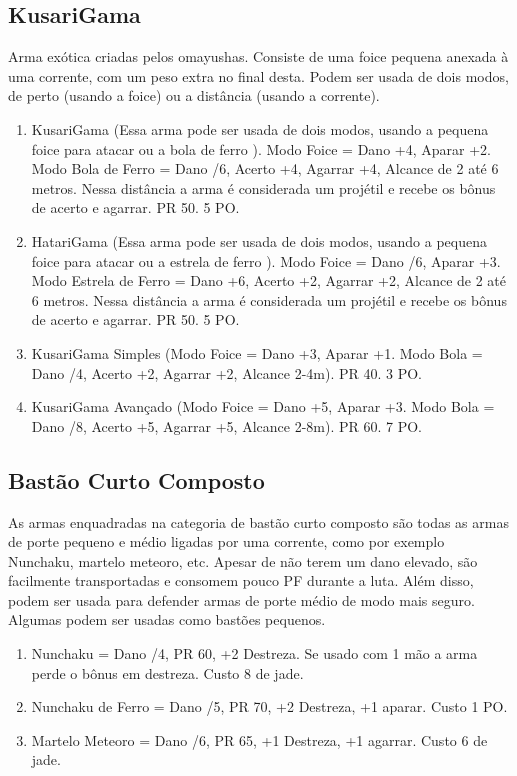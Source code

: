 \subsection{KusariGama}
Arma exótica criadas pelos omayushas. Consiste de uma foice pequena anexada à uma corrente, com um peso extra no final desta. Podem ser usada de dois modos, de perto (usando a foice) ou a distância (usando a corrente).

\begin{enumerate}
	\item KusariGama (Essa arma pode ser usada de dois modos, usando a pequena foice para atacar ou a bola de ferro ). Modo Foice = Dano +4, Aparar +2. Modo Bola de Ferro = Dano /6, Acerto +4, Agarrar +4, Alcance de 2 até 6 metros. Nessa distância a arma é considerada um projétil e recebe os bônus de acerto e agarrar. PR 50. 5 PO. 
	\item HatariGama (Essa arma pode ser usada de dois modos, usando a pequena foice para atacar ou a estrela de ferro ). Modo Foice = Dano /6, Aparar +3. Modo Estrela de Ferro = Dano +6, Acerto +2, Agarrar +2, Alcance de 2 até 6 metros. Nessa distância a arma é considerada um projétil e recebe os bônus de acerto e agarrar. PR 50. 5 PO. 
	\item KusariGama Simples (Modo Foice = Dano +3, Aparar +1. Modo Bola = Dano /4, Acerto +2, Agarrar +2, Alcance 2-4m). PR 40. 3 PO.
	\item KusariGama Avançado (Modo Foice = Dano +5, Aparar +3. Modo Bola = Dano /8, Acerto +5, Agarrar +5, Alcance 2-8m). PR 60. 7 PO.
\end{enumerate}


\subsection{Bastão Curto Composto}
As armas enquadradas na categoria de bastão curto composto são todas as armas de porte pequeno e médio ligadas por uma corrente, como por exemplo Nunchaku, martelo meteoro, etc. Apesar de não terem um dano elevado, são facilmente transportadas e consomem pouco PF durante a luta. Além disso, podem ser usada para defender armas de porte médio de modo mais seguro. Algumas podem ser usadas como bastões pequenos.

\begin{enumerate}
	\item Nunchaku = Dano /4, PR 60, +2 Destreza. Se usado com 1 mão a arma perde o bônus em destreza. Custo 8 de jade.	
	\item Nunchaku de Ferro = Dano /5, PR 70, +2 Destreza, +1 aparar. Custo 1 PO.
	\item Martelo Meteoro = Dano /6, PR 65, +1 Destreza, +1 agarrar. Custo 6 de jade.
\end{enumerate}


